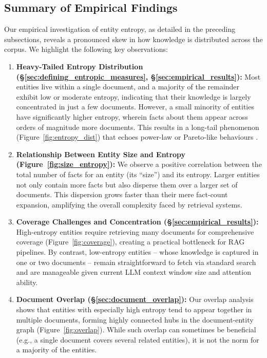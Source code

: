 \documentclass[11pt,a4paper]{article}
\begin{document}
\subsection{Summary of Empirical Findings}

Our empirical investigation of entity entropy, as detailed in the preceding subsections, reveals a pronounced skew in how knowledge is distributed across the corpus. We highlight the following key observations:

\begin{enumerate}
    \item \textbf{Heavy-Tailed Entropy Distribution (\S\ref{sec:defining_entropic_measures}, \S\ref{sec:empirical_results}):}
    Most entities live within a single document, and a majority of the remainder exhibit low or moderate entropy, indicating that their knowledge is largely concentrated in just a few documents. However, a small minority of entities have significantly higher entropy, wherein facts about them appear across orders of magnitude more documents. This results in a long-tail phenomenon (Figure~\ref{fig:entropy_dist}) that echoes power-law or Pareto-like behaviours \cite{newman2005power}.

    \item \textbf{Relationship Between Entity Size and Entropy (Figure~\ref{fig:size_entropy}):}
    We observe a positive correlation between the total number of facts for an entity (its ``size'') and its entropy. Larger entities not only contain more facts but also disperse them over a larger set of documents. This dispersion grows faster than their mere fact-count expansion, amplifying the overall complexity faced by retrieval systems.

    \item \textbf{Coverage Challenges and Concentration (\S\ref{sec:empirical_results}):}
    High-entropy entities require retrieving many documents for comprehensive coverage (Figure~\ref{fig:coverage}), creating a practical bottleneck for RAG pipelines. By contrast, low-entropy entities -- whose knowledge is captured in one or two documents -- remain straightforward to fetch via standard search and are manageable given current LLM context window size and attention ability.

    \item \textbf{Document Overlap (\S\ref{sec:document_overlap}):}
    Our overlap analysis shows that entities with especially high entropy tend to appear together in multiple documents, forming highly connected hubs in the document-entity graph (Figure~\ref{fig:overlap}). While such overlap can sometimes be beneficial (e.g., a single document covers several related entities), it is not the norm for a majority of the entities.


\end{enumerate}
\end{document}
